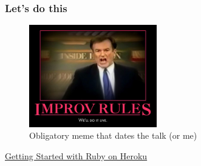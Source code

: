 \documentclass{beamer}
\begin{document}
\begin{frame}[fragile]
  \frametitle{Let's do this}

   \begin{figure}[p]
    \centering
    \includegraphics[width=15em]{well-do-it-live.jpg}
    \caption{Obligatory meme that dates the talk (or me)}
  \end{figure}

  \centering\href{https://devcenter.heroku.com/articles/getting-started-with-ruby#introduction}{Getting Started with Ruby on Heroku}
  
\end{frame}
\end{document}
